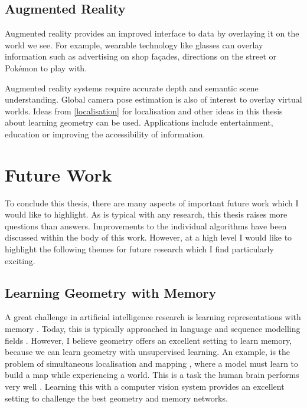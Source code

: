 \subsection{Augmented Reality}
Augmented reality provides an improved interface to data by overlaying it on the world we see. For example, wearable technology like glasses can overlay information such as advertising on shop façades, directions on the street or Pokémon to play with.

Augmented reality systems require accurate depth and semantic scene understanding. Global camera pose estimation is also of interest to overlay virtual worlds. Ideas from \cref{localisation} for localisation and other ideas in this thesis about learning geometry can be used. Applications include entertainment, education or improving the accessibility of information.



\section{Future Work}

To conclude this thesis, there are many aspects of important future work which I would like to highlight. As is typical with any research, this thesis raises more questions than answers. Improvements to the individual algorithms have been discussed within the body of this work. However, at a high level I would like to highlight the following themes for future research which I find particularly exciting.

\subsection{Learning Geometry with Memory}
A great challenge in artificial intelligence research is learning representations with memory \citep{graves2014neural}. Today, this is typically approached in language and sequence modelling fields \citep{weston2014memory}. However, I believe geometry offers an excellent setting to learn memory, because we can learn geometry with unsupervised learning. An example, is the problem of simultaneous localisation and mapping \citep{durrant2006simultaneous}, where a model must learn to build a map while experiencing a world. This is a task the human brain performs very well \citep{moser2008place,o1978hippocampus}. Learning this with a computer vision system provides an excellent setting to challenge the best geometry and memory networks.


